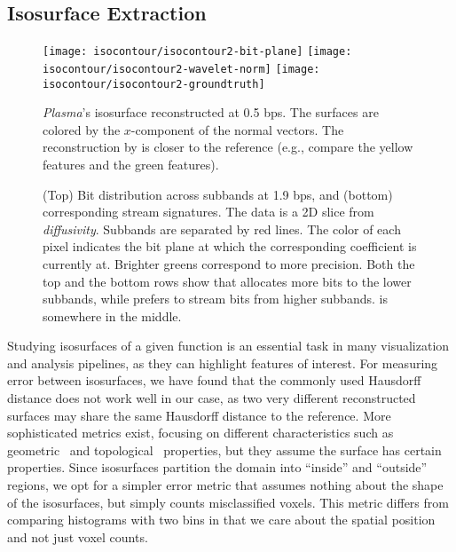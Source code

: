 \subsection{Isosurface Extraction}\label{sec:isocontour}

\begin{figure}[t]
\centering
{}
{\texttt{[image: isocontour/isocontour2-bit-plane]}}
{\texttt{[image: isocontour/isocontour2-wavelet-norm]}}
{\texttt{[image: isocontour/isocontour2-groundtruth]}}
\caption{\emph{Plasma}'s isosurface reconstructed at 0.5 bps. The surfaces are colored by the
$x$-component of the normal vectors. The reconstruction by \sbit is closer to the reference (e.g., compare
the yellow features and the green features).}
\label{fig:isocontour-surfaces-plasma}
\end{figure}

\begin{figure}[t]
\centering
\caption{(Top) Bit distribution across subbands at 1.9 bps, and (bottom) corresponding stream
signatures. The data is a 2D slice from \emph{diffusivity}. Subbands are separated by red lines. The
color of each pixel indicates the bit plane at which the corresponding coefficient is currently at.
Brighter greens correspond to more precision. Both the top and the bottom rows show that \shsg
allocates more bits to the lower subbands, while \slsg prefers to stream bits from higher subbands.
\ssig is somewhere in the middle.}
\label{fig:bit-distrib}
\end{figure}

Studying isosurfaces of a given function is an essential task in many visualization and analysis
pipelines, as they can highlight features of interest. For measuring error between isosurfaces, we
have found that the commonly used Hausdorff distance does not work well in our case, as two very
different reconstructed surfaces may share the same Hausdorff distance to the reference. More
sophisticated metrics exist, focusing on different characteristics such as
geometric~\cite{verifiable-isosurface} and topological~\cite{topology-verification-isosurface}
properties, but they assume the surface has certain properties. Since isosurfaces partition the
domain into ``inside'' and ``outside'' regions, we opt for a simpler error metric that assumes
nothing about the shape of the isosurfaces, but simply counts misclassified voxels. This metric
differs from comparing histograms with two bins in that we care about the spatial position and not
just voxel counts.

